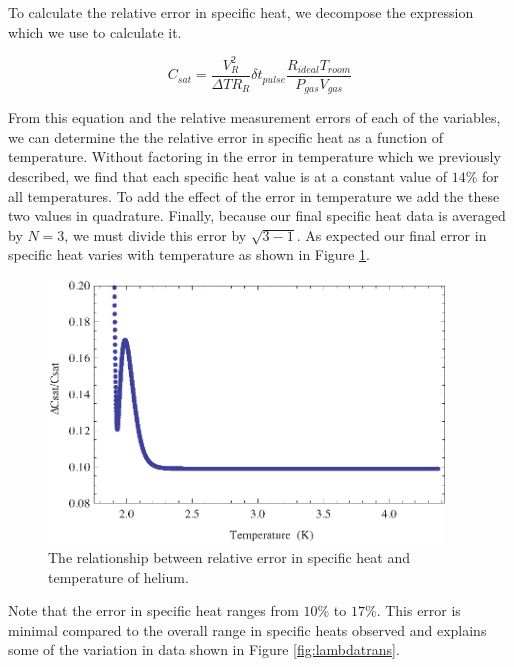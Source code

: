 To calculate the relative error in specific heat, we decompose the expression which we use to calculate it.

\begin{center}
\begin{equation}
C_{sat}=\frac{V_{R}^{2}}{\Delta T R_{R}}\delta t_{pulse} \frac{R_{ideal}T_{room}}{P_{gas}V_{gas}}
\end{equation}
\end{center}

From this equation and the relative measurement errors of each of the variables, we can determine the the relative error in specific heat as a function of temperature.  Without factoring in the error in temperature which we previously described, we find that each specific heat value is at a constant value of $14\%$ for all temperatures.  To add the effect of the error in temperature we add the these two values in quadrature.  Finally, because our final specific heat data is averaged by $N=3$, we must divide this error by $\sqrt{3-1}$. As expected our final error in specific heat varies with temperature as shown in Figure \ref{fig:heatcaperror}.

\begin{figure}[htbp]
\begin{center}
\includegraphics[height=70mm]{./figures/heatcaperror.eps}
\caption{\small{The relationship between relative error in specific heat and temperature of helium.}}
\label{fig:heatcaperror}
\end{center}
\end{figure}

Note that the error in specific heat ranges from $10\%$ to $17\%$.  This error is minimal compared to the overall range in specific heats observed and explains some of the variation in data shown in Figure \ref{fig:lambdatrans}.
